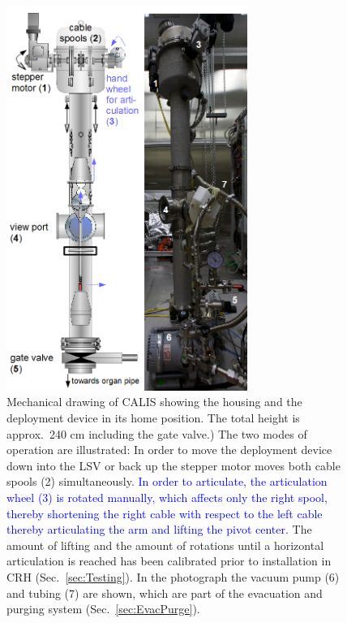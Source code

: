 \begin{figure}[htbp]
 \centering
\includegraphics[width=0.7\textwidth]{Figures/CALIS_overview.png}
 \caption{Mechanical drawing of CALIS showing the housing and the deployment device in its home position. The total height is approx.~240 cm including the gate valve.) The two modes of operation are illustrated: In order to move the deployment device down into the LSV or back up the stepper motor moves both cable spools (2) simultaneously. \textcolor{blue}{In order to articulate, the articulation wheel (3) is rotated manually, which affects only the right spool, thereby shortening the right cable with respect to the left cable thereby articulating the arm and lifting the pivot center.} The amount of lifting and the amount of rotations until a horizontal articulation is reached has been calibrated prior to installation in CRH (Sec.~\ref{sec:Testing}). In the photograph the vacuum pump (6) and tubing (7) are shown, which are part of the evacuation and purging system (Sec.~\ref{sec:EvacPurge}). \label{fig:CALISDimensions}\label{fig:CALISMechanism}\label{fig:gearDrawing}\label{fig:flushing_purging}
}
\end{figure}

